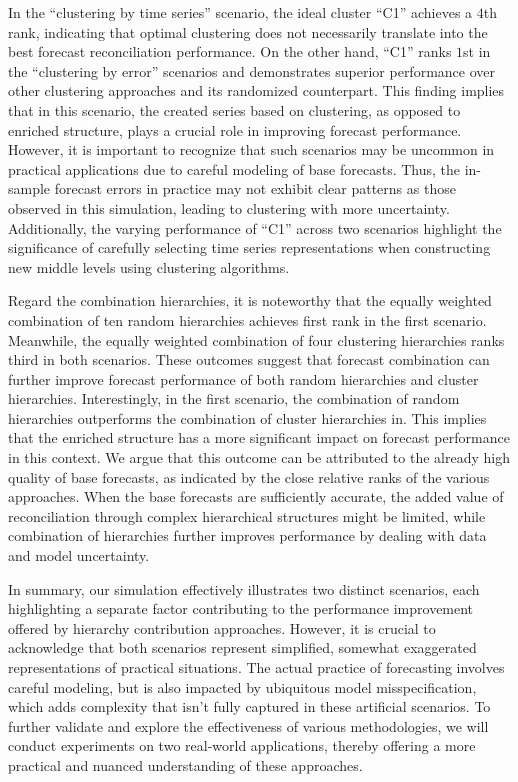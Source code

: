 \documentclass[a4paper,review,12pt,authoryear]{elsarticle}
\begin{document}
In the ``clustering by time series'' scenario, the ideal cluster ``C1'' achieves a $4$th rank, indicating that optimal clustering does not necessarily translate into the best forecast reconciliation performance. 
On the other hand, ``C1'' ranks $1$st in the ``clustering by error'' scenarios and demonstrates superior performance over other clustering approaches and its randomized counterpart. This finding implies that in this scenario, the created series based on clustering, as opposed to enriched structure, plays a crucial role in improving forecast performance.
However, it is important to recognize that such scenarios may be uncommon in practical applications due to careful modeling of base forecasts. Thus, the in-sample forecast errors in practice may not exhibit clear patterns as those observed in this simulation, leading to clustering with more uncertainty.
Additionally, the varying  performance of ``C1'' across two scenarios highlight the significance of carefully selecting time series representations when constructing new middle levels using clustering algorithms.


Regard the combination hierarchies, it is noteworthy that the equally weighted combination of ten random hierarchies achieves first rank in the first scenario. Meanwhile, the equally weighted combination of four clustering hierarchies ranks third in both scenarios. These outcomes suggest that forecast combination can further improve forecast performance of both random hierarchies and cluster hierarchies. Interestingly, in the first scenario, the combination of random hierarchies outperforms the combination of cluster hierarchies in. This implies that the enriched structure has a more significant impact on forecast performance in this context. We argue that this outcome can be attributed to the already high quality of base forecasts, as indicated by the close relative ranks of the various approaches.  When the base forecasts are sufficiently accurate, the added value of reconciliation through complex hierarchical structures might be limited, while combination of hierarchies further improves performance by dealing with data and model uncertainty.

In summary, our simulation effectively illustrates two distinct scenarios, each highlighting a separate factor contributing to the performance improvement offered by hierarchy contribution approaches. However, it is crucial to acknowledge that both scenarios represent simplified, somewhat exaggerated representations of practical situations. The actual practice of forecasting involves careful modeling, but is also impacted by ubiquitous model misspecification, which adds complexity that isn't fully captured in these artificial scenarios. To further validate and explore the effectiveness of various methodologies, we will conduct experiments on two real-world applications, thereby offering a more practical and nuanced understanding of these approaches.
\end{document}
